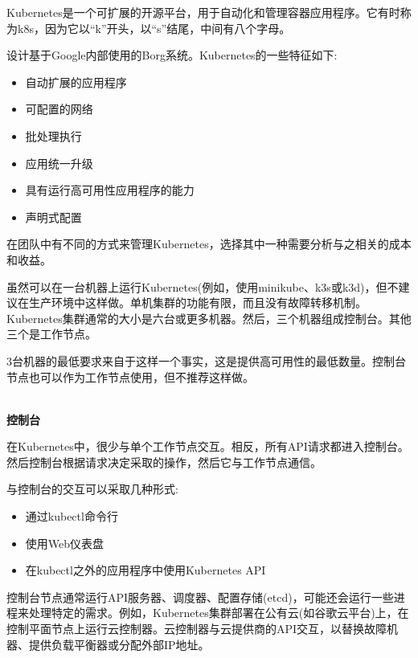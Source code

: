 
Kubernetes是一个可扩展的开源平台，用于自动化和管理容器应用程序。它有时称为k8s，因为它以“k”开头，以“s”结尾，中间有八个字母。

设计基于Google内部使用的Borg系统。Kubernetes的一些特征如下:

\begin{itemize}
\item 
自动扩展的应用程序

\item 
可配置的网络

\item 
批处理执行

\item 
应用统一升级

\item 
具有运行高可用性应用程序的能力

\item 
声明式配置
\end{itemize}

在团队中有不同的方式来管理Kubernetes，选择其中一种需要分析与之相关的成本和收益。


虽然可以在一台机器上运行Kubernetes(例如，使用minikube、k3s或k3d)，但不建议在生产环境中这样做。单机集群的功能有限，而且没有故障转移机制。Kubernetes集群通常的大小是六台或更多机器。然后，三个机器组成控制台。其他三个是工作节点。

3台机器的最低要求来自于这样一个事实，这是提供高可用性的最低数量。控制台节点也可以作为工作节点使用，但不推荐这样做。

\hspace*{\fill} \\ %
\noindent
\textbf{控制台}

在Kubernetes中，很少与单个工作节点交互。相反，所有API请求都进入控制台。然后控制台根据请求决定采取的操作，然后它与工作节点通信。

与控制台的交互可以采取几种形式:

\begin{itemize}
\item 
通过kubectl命令行

\item 
使用Web仪表盘

\item 
在kubectl之外的应用程序中使用Kubernetes API
\end{itemize}

控制台节点通常运行API服务器、调度器、配置存储(etcd)，可能还会运行一些进程来处理特定的需求。例如，Kubernetes集群部署在公有云(如谷歌云平台)上，在控制平面节点上运行云控制器。云控制器与云提供商的API交互，以替换故障机器、提供负载平衡器或分配外部IP地址。

